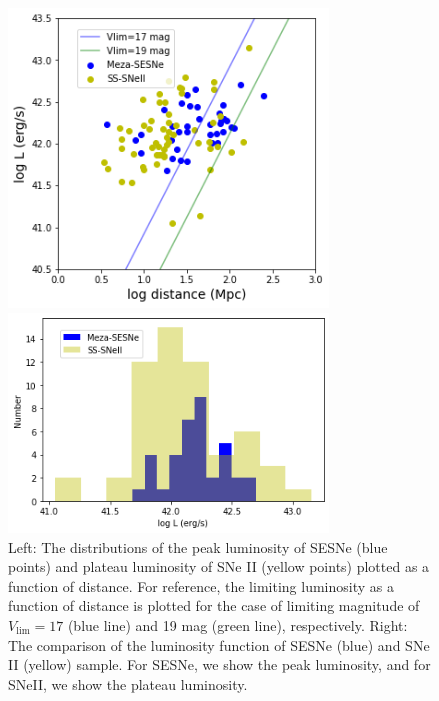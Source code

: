 \documentclass[twocolumn, linenumbers]{aastex62}
\begin{document}
\begin{figure}[htbp]
    \begin{minipage}{0.5\hsize}
    \begin{center}
      \includegraphics[width=85mm]{Lpeak_dist.png}
    \end{center}
  \end{minipage}
  \begin{minipage}{0.5\hsize}
    \begin{center}
       \includegraphics[width=85mm]{Lfunc_compare.png}
    \end{center}
  \end{minipage}
 \caption{Left: The distributions of the peak luminosity of SESNe (blue points) and plateau luminosity of SNe II (yellow points) plotted as a function of distance. For reference, the limiting luminosity as a function of distance is plotted for the case of limiting magnitude of $V_{\mathrm{lim}} = 17$ (blue line) and 19 mag (green line), respectively. Right: The comparison of the luminosity function of SESNe (blue) and SNe II (yellow) sample. For SESNe, we show the peak luminosity, and for SNeII, we show the plateau luminosity.}
 \label{L_funcs}
\end{figure}
\end{document}
